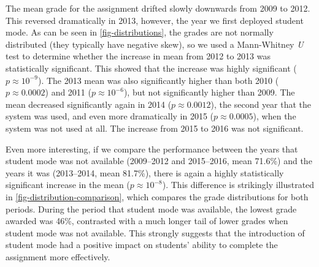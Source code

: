 \documentclass[sigconf, review, anonymous, capitalise]{acmart}
\begin{document}
The mean grade for the assignment drifted slowly downwards from 2009 to 2012. This reversed dramatically in 2013, however, the year we first deployed student mode. As can be seen in \cref{fig-distributions}, the grades are not normally distributed (they typically have negative skew), so we used a Mann-Whitney \emph{U} test to determine whether the increase in mean from 2012 to 2013 was statistically significant. This showed that the increase was highly significant (\(p \approx 10^{-9}\)). The 2013 mean was also significantly higher than both 2010 (\(p \approx 0.0002\)) and 2011 (\(p \approx 10^{-6}\)), but not significantly higher than 2009. The mean decreased significantly again in 2014 (\(p \approx 0.0012\)), the second year that the system was used, and even more dramatically in 2015 (\(p \approx 0.0005\)), when the system was not used at all. The increase from 2015 to 2016 was not significant.

Even more interesting, if we compare the performance between the years that student mode was not available (2009--2012 and 2015--2016, mean 71.6\%) and the years it was (2013--2014, mean 81.7\%), there is again a highly statistically significant increase in the mean (\(p \approx 10^{-8}\)). This difference is strikingly illustrated in \cref{fig-distribution-comparison}, which compares the grade distributions for both periods. During the period that student mode was available, the lowest grade awarded was 46\%, contrasted with a much longer tail of lower grades when student mode was not available. This strongly suggests that the introduction of student mode had a positive impact on students' ability to complete the assignment more effectively.
\end{document}
